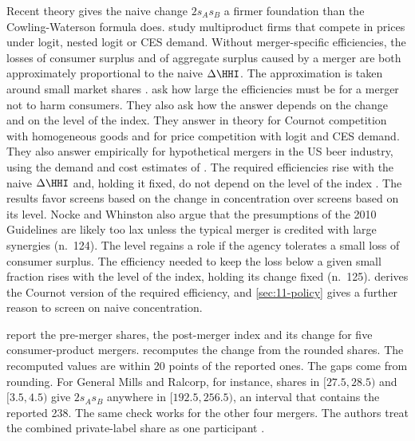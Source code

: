 Recent theory gives the naive change $2s_As_B$ a firmer foundation than the Cowling-Waterson formula does.
\citet{NockeSchutz2019} study multiproduct firms that compete in prices under logit, nested logit or CES demand.
Without merger-specific efficiencies, the losses of consumer surplus and of aggregate surplus caused by a merger are
both approximately proportional to the naive $\Delta\HHI$. The approximation is taken around small market shares
\citep[p.~226]{AskerNocke2021}. \citet{NockeWhinston2020} ask how large the efficiencies must be for a merger not to
harm consumers. They also ask how the answer depends on the change and on the level of the index. They answer in theory for
Cournot competition with homogeneous goods and for price competition with logit and CES demand. They also answer
empirically for hypothetical mergers in the US beer industry, using the demand and cost estimates of
\citet{MillerWeinberg2017}. The required efficiencies
rise with the naive $\Delta\HHI$ and, holding it fixed, do not depend on the level of the index
\citep[p.~227]{AskerNocke2021}. The results favor screens based on the change in concentration over screens based
on its level. Nocke and Whinston also argue that the presumptions of the 2010 Guidelines are likely too lax unless
the typical merger is credited with large synergies (n.~124). The level regains a role if the agency tolerates a
small loss of consumer surplus. The efficiency needed to keep the loss below a given small fraction rises with the
level of the index, holding its change fixed (n.~125).  derives the Cournot version of the required
efficiency, and \cref{sec:11-policy} gives a further reason to screen on naive concentration.

\citet[Table 2]{AshenfelterHosken2008} report the pre-merger shares, the post-merger index and its change for five
consumer-product mergers.  recomputes the change from the rounded shares. The recomputed values
are within 20 points of the reported ones. The gaps come from rounding. For General Mills and Ralcorp, for
instance, shares in $[27.5, 28.5)$ and $[3.5, 4.5)$ give $2 s_A s_B$ anywhere in $[192.5, 256.5)$, an interval
that contains the reported 238. The same check works for the other four mergers. The authors treat the combined
private-label share as one participant \citep[p.~11, n.~24]{AshenfelterHosken2008}.

